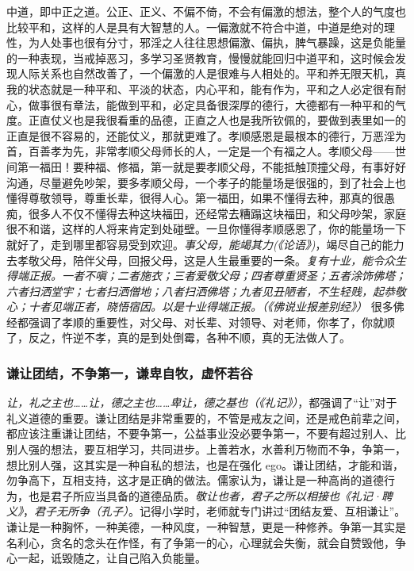 中道，即中正之道。公正、正义、不偏不倚，不会有偏激的想法，整个人的气度也比较平和，这样的人是具有大智慧的人。一偏激就不符合中道，中道是绝对的理性，为人处事也很有分寸，邪淫之人往往思想偏激、偏执，脾气暴躁，这是负能量的一种表现，当戒掉恶习，多学习圣贤教育，慢慢就能回归中道平和，这时候会发现人际关系也自然改善了，一个偏激的人是很难与人相处的。平和养无限天机，真我的状态就是一种平和、平淡的状态，内心平和，能有作为，平和之人必定很有耐心，做事很有章法，能做到平和，必定具备很深厚的德行，大德都有一种平和的气度。正直仗义也是我很看重的品德，正直之人也是我所钦佩的，要做到表里如一的正直是很不容易的，还能仗义，那就更难了。孝顺感恩是最根本的德行，万恶淫为首，百善孝为先，非常孝顺父母师长的人，一定是一个有福之人。孝顺父母——世间第一福田！要种福、修福，第一就是要孝顺父母，不能抵触顶撞父母，有事好好沟通，尽量避免吵架，要多孝顺父母，一个孝子的能量场是很强的，到了社会上也懂得尊敬领导，尊重长辈，很得人心。第一福田，如果不懂得去种，那真的很愚痴，很多人不仅不懂得去种这块福田，还经常去糟蹋这块福田，和父母吵架，家庭很不和谐，这样的人将来肯定到处碰壁。一旦你懂得孝顺感恩了，你的能量场一下就好了，走到哪里都容易受到欢迎。\textit{事父母，能竭其力(《论语》)}，竭尽自己的能力去孝敬父母，陪伴父母，回报父母，这是人生最重要的一条。\textit{复有十业，能令众生得端正报。一者不嗔；二者施衣；三者爱敬父母；四者尊重贤圣；五者涂饰佛塔；六者扫洒堂宇；七者扫洒僧地；八者扫洒佛塔；九者见丑陋者，不生轻贱，起恭敬心；十者见端正者，晓悟宿因。以是十业得端正报。（《佛说业报差别经》）} 很多佛经都强调了孝顺的重要性，对父母、对长辈、对领导、对老师，你孝了，你就顺了，反之，忤逆不孝，真的是到处倒霉，各种不顺，真的无法做人了。

\subsubsection{谦让团结，不争第一，谦卑自牧，虚怀若谷}

\textit{让，礼之主也……让，德之主也……卑让，德之基也（《礼记》）}，都强调了“让”对于礼义道德的重要。谦让团结是非常重要的，不管是戒友之间，还是戒色前辈之间，都应该注重谦让团结，不要争第一，公益事业没必要争第一，不要有超过别人、比别人强的想法，要互相学习，共同进步。上善若水，水善利万物而不争，争第一，想比别人强，这其实是一种自私的想法，也是在强化 ego。谦让团结，才能和谐，勿争高下，互相支持，这才是正确的做法。儒家认为，谦让是一种高尚的道德行为，也是君子所应当具备的道德品质。\textit{敬让也者，君子之所以相接也《礼记·聘义》}，\textit{君子无所争（孔子）}。记得小学时，老师就专门讲过“团结友爱、互相谦让”。谦让是一种胸怀，一种美德，一种风度，一种智慧，更是一种修养。争第一其实是名利心，贪名的念头在作怪，有了争第一的心，心理就会失衡，就会自赞毁他，争心一起，诋毁随之，让自己陷入负能量。

